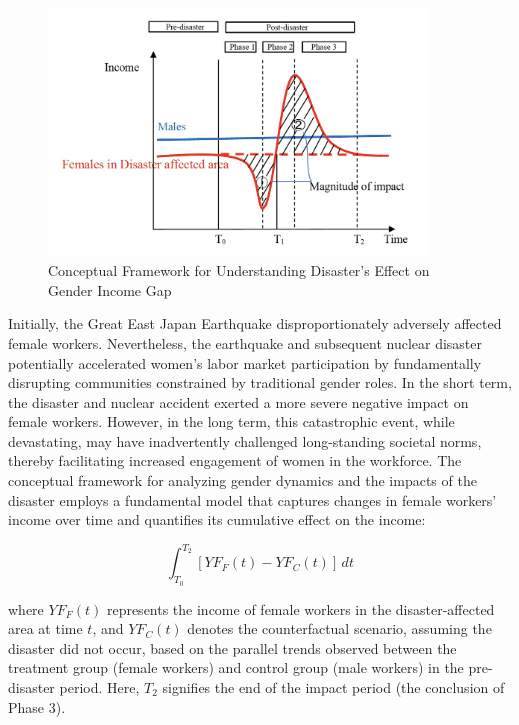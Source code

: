 \documentclass[a4paper,12pt]{article}
\begin{document}
\begin{figure}[h!]
    \centering
    \includegraphics[width=0.9\textwidth]{Final_conceptual_model.jpeg}  %
    \caption{Conceptual Framework for Understanding Disaster's Effect on Gender Income Gap}
    \label{fig:conceptual_model}
\end{figure}

Initially, the Great East Japan Earthquake disproportionately adversely affected female workers. Nevertheless, the earthquake and subsequent nuclear disaster potentially accelerated women's labor market participation by fundamentally disrupting communities constrained by traditional gender roles. In the short term, the disaster and nuclear accident exerted a more severe negative impact on female workers. However, in the long term, this catastrophic event, while devastating, may have inadvertently challenged long-standing societal norms, thereby facilitating increased engagement of women in the workforce. The conceptual framework for analyzing gender dynamics and the impacts of the disaster employs a fundamental model that captures changes in female workers' income over time and quantifies its cumulative effect on the income:

\begin{equation}
\int_{T_0}^{T_2} \left[ YF_F(t) - YF_C(t) \right] \, dt
\end{equation}

where $YF_F(t)$ represents the income of female workers in the disaster-affected area at time $t$, and $YF_C(t)$ denotes the counterfactual scenario, assuming the disaster did not occur, based on the parallel trends observed between the treatment group (female workers) and control group (male workers) in the pre-disaster period. Here, $T_{2}$ signifies the end of the impact period (the conclusion of Phase 3).
\end{document}
